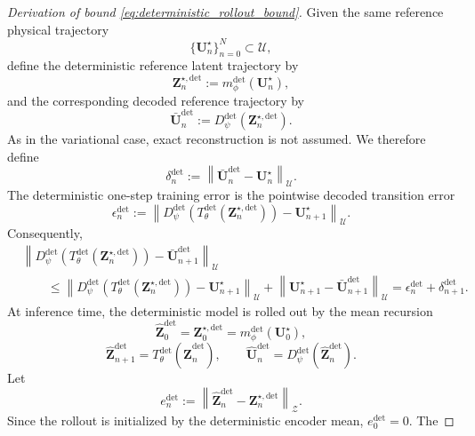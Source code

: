 \documentclass[11pt]{article}
\begin{document}
\begin{proof}[Derivation of bound \eqref{eq:deterministic_rollout_bound}]
Given the same reference physical trajectory
\[
    \{\mathbf U_n^\star\}_{n=0}^N\subset\mathcal U,
\]
define the deterministic reference latent trajectory by
\[
    \mathbf Z_n^{\star,\mathrm{det}}
    :=
    m_\phi^{\mathrm{det}}(\mathbf U_n^\star),
\]
and the corresponding decoded reference trajectory by
\[
    \bar{\mathbf U}_n^{\mathrm{det}}
    :=
    D_\psi^{\mathrm{det}}(\mathbf Z_n^{\star,\mathrm{det}}).
\]
As in the variational case, exact reconstruction is not assumed. We therefore define
\[
    \delta_n^{\mathrm{det}}
    :=
    \left\|
    \bar{\mathbf U}_n^{\mathrm{det}}
    -
    \mathbf U_n^\star
    \right\|_{\mathcal U}.
\]
The deterministic one-step training error is the pointwise decoded transition error
\[
    \epsilon_n^{\mathrm{det}}
    :=
    \left\|
    D_\psi^{\mathrm{det}}
    \left(
    T_\theta^{\mathrm{det}}(\mathbf Z_n^{\star,\mathrm{det}})
    \right)
    -
    \mathbf U_{n+1}^\star
    \right\|_{\mathcal U}.
\]
Consequently,
\[
\begin{aligned}
    &
    \left\|
    D_\psi^{\mathrm{det}}
    \left(
    T_\theta^{\mathrm{det}}(\mathbf Z_n^{\star,\mathrm{det}})
    \right)
    -
    \bar{\mathbf U}_{n+1}^{\mathrm{det}}
    \right\|_{\mathcal U}
    \\
    &\qquad\le
    \left\|
    D_\psi^{\mathrm{det}}
    \left(
    T_\theta^{\mathrm{det}}(\mathbf Z_n^{\star,\mathrm{det}})
    \right)
    -
    \mathbf U_{n+1}^\star
    \right\|_{\mathcal U}
    +
    \left\|
    \mathbf U_{n+1}^\star
    -
    \bar{\mathbf U}_{n+1}^{\mathrm{det}}
    \right\|_{\mathcal U}=
    \epsilon_n^{\mathrm{det}}+\delta_{n+1}^{\mathrm{det}} .
\end{aligned}
\]
At inference time, the deterministic model is rolled out by the mean recursion
\[
    \widehat{\mathbf Z}_0^{\mathrm{det}}
    =
    \mathbf Z_0^{\star,\mathrm{det}}
    =
    m_\phi^{\mathrm{det}}(\mathbf U_0^\star),
\]
\[
    \widehat{\mathbf Z}_{n+1}^{\mathrm{det}}
    =
    T_\theta^{\mathrm{det}}
    \left(
    \widehat{\mathbf Z}_{n}^{\mathrm{det}}
    \right),
    \qquad
    \widehat{\mathbf U}_{n}^{\mathrm{det}}
    =
    D_\psi^{\mathrm{det}}
    \left(
    \widehat{\mathbf Z}_{n}^{\mathrm{det}}
    \right).
\]
Let
\[
    e_n^{\mathrm{det}}
    :=
    \left\|
    \widehat{\mathbf Z}_n^{\mathrm{det}}
    -
    \mathbf Z_n^{\star,\mathrm{det}}
    \right\|_{\mathcal Z}.
\]
Since the rollout is initialized by the deterministic encoder mean, $e_0^{\mathrm{det}}=0$. The

\end{proof}
\end{document}
